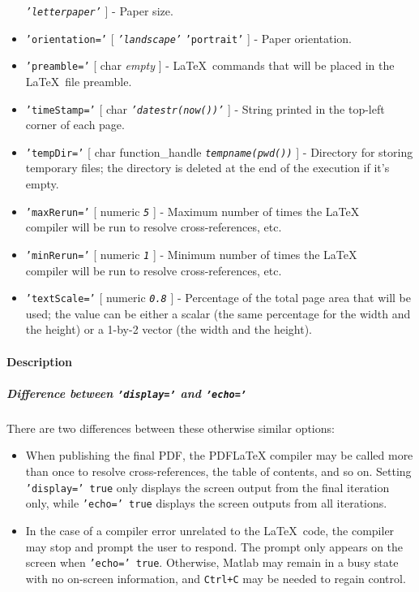 \begin{itemize}
  \emph{\texttt{'letterpaper'}} {]} - Paper size.
\item
  \texttt{'orientation='} {[} \emph{\texttt{'landscape'}} \textbar{}
  \texttt{'portrait'} {]} - Paper orientation.
\item
  \texttt{'preamble='} {[} char \textbar{} \emph{empty} {]} -
  \LaTeX~commands that will be placed in the \LaTeX~file preamble.
\item
  \texttt{'timeStamp='} {[} char \textbar{}
  \emph{\texttt{'datestr(now())'}} {]} - String printed in the top-left
  corner of each page.
\item
  \texttt{'tempDir='} {[} char \textbar{} function\_handle \textbar{}
  \emph{\texttt{tempname(pwd())}} {]} - Directory for storing temporary
  files; the directory is deleted at the end of the execution if it's
  empty.
\item
  \texttt{'maxRerun='} {[} numeric \textbar{} \emph{\texttt{5}} {]} -
  Maximum number of times the \LaTeX\\compiler will be run to resolve
  cross-references, etc.
\item
  \texttt{'minRerun='} {[} numeric \textbar{} \emph{\texttt{1}} {]} -
  Minimum number of times the \LaTeX\\compiler will be run to resolve
  cross-references, etc.
\item
  \texttt{'textScale='} {[} numeric \textbar{} \emph{\texttt{0.8}} {]} -
  Percentage of the total page area that will be used; the value can be
  either a scalar (the same percentage for the width and the height) or
  a 1-by-2 vector (the width and the height).
\end{itemize}

\paragraph{Description}

\subparagraph{Difference between \texttt{'display='} and
\texttt{'echo='}}

There are two differences between these otherwise similar options:

\begin{itemize}
\item
  When publishing the final PDF, the PDFLaTeX compiler may be called
  more than once to resolve cross-references, the table of contents, and
  so on. Setting \texttt{'display=' true} only displays the screen
  output from the final iteration only, while \texttt{'echo=' true}
  displays the screen outputs from all iterations.
\item
  In the case of a compiler error unrelated to the \LaTeX~code, the
  compiler may stop and prompt the user to respond. The prompt only
  appears on the screen when \texttt{'echo=' true}. Otherwise, Matlab
  may remain in a busy state with no on-screen information, and
  \texttt{Ctrl+C} may be needed to regain control.
\end{itemize}

